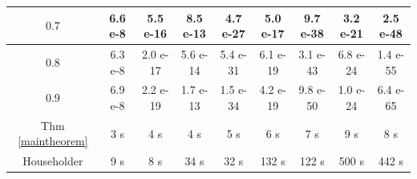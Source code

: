 \documentclass{article}
\begin{document}
\begin{table}[t!]
\begin{tabular}{|c|cccccccc|}
	$0.7$                & \multicolumn{1}{c|}{6.6 e-8} & \multicolumn{1}{c|}{5.5 e-16} & \multicolumn{1}{c|}{8.5 e-13} & \multicolumn{1}{c|}{4.7 e-27} & \multicolumn{1}{c|}{5.0 e-17} & \multicolumn{1}{c|}{9.7 e-38} & \multicolumn{1}{c|}{3.2 e-21} & 2.5 e-48 \\ \hline
	$0.8$                & \multicolumn{1}{c|}{6.3 e-8} & \multicolumn{1}{c|}{2.0 e-17} & \multicolumn{1}{c|}{5.6 e-14} & \multicolumn{1}{c|}{5.4 e-31} & \multicolumn{1}{c|}{6.1 e-19} & \multicolumn{1}{c|}{3.1 e-43} & \multicolumn{1}{c|}{6.8 e-24} & 1.4 e-55 \\ \hline
	$0.9$                & \multicolumn{1}{c|}{6.9 e-8} & \multicolumn{1}{c|}{2.2 e-19} & \multicolumn{1}{c|}{1.7 e-13} & \multicolumn{1}{c|}{1.5 e-34} & \multicolumn{1}{c|}{4.2 e-19} & \multicolumn{1}{c|}{9.8 e-50} & \multicolumn{1}{c|}{1.0 e-24} & 6.4 e-65 \\ \hline
	Thm \ref{maintheorem}              & \multicolumn{1}{c|}{3 s}     & \multicolumn{1}{c|}{4 s}      & \multicolumn{1}{c|}{4 s}      & \multicolumn{1}{c|}{5 s}      & \multicolumn{1}{c|}{6 s}      & \multicolumn{1}{c|}{7 s}      & \multicolumn{1}{c|}{9 s}      & 8 s      \\ \hline
	Householder          & \multicolumn{1}{c|}{9 s}     & \multicolumn{1}{c|}{8 s}      & \multicolumn{1}{c|}{34 s}     & \multicolumn{1}{c|}{32 s}     & \multicolumn{1}{c|}{132 s}    & \multicolumn{1}{c|}{122 s}    & \multicolumn{1}{c|}{500 s}    & 442 s    \\ \hline
\end{tabular}



\end{table}
\end{document}
